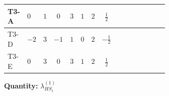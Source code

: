 \documentclass[8pt]{article}
\begin{document}
\begin{landscape}
\begin{longtable}{@{}llcccccc >{\raggedright\arraybackslash}p{0.21\linewidth} >{\raggedright\arraybackslash}p{0.21\linewidth} >{\raggedright\arraybackslash}p{0.21\linewidth}@{}}
\midrule
T3-A & $0$ & $1$ & $0$ & $3$ & $1$ & $2$ & $\frac{1}{2}$ & \scriptsize\adjustbox{max width=\linewidth}{$\begin{gathered} +6 {\lambda_1} {\lambda_{HS_1}^{(1)}}\end{gathered}$} & \scriptsize\adjustbox{max width=\linewidth}{$\begin{gathered} +4 {\lambda_{HS_1}^{(1)}}^2\end{gathered}$} & \scriptsize\adjustbox{max width=\linewidth}{$\begin{gathered} +4 {\lambda_{HS_1}^{(1)}} {\lambda_{S_1}^{(1)}}\end{gathered}$} \\
\midrule
T3-D & $-2$ & $3$ & $-1$ & $1$ & $0$ & $2$ & $-\frac{1}{2}$ & \scriptsize\adjustbox{max width=\linewidth}{$\begin{gathered} +6 {\lambda_1} {\lambda_{HS_1}^{(1)}}\end{gathered}$} & \scriptsize\adjustbox{max width=\linewidth}{$\begin{gathered} +4 {\lambda_{HS_1}^{(1)}}^2\end{gathered}$} & \scriptsize\adjustbox{max width=\linewidth}{$\begin{gathered} +8 {\lambda_{HS_1}^{(1)}} {\lambda_{S_1}^{(1)}}\end{gathered}$} \\
\midrule
T3-E & $0$ & $3$ & $0$ & $3$ & $1$ & $2$ & $\frac{1}{2}$ & \scriptsize\adjustbox{max width=\linewidth}{$\begin{gathered} +6 {\lambda_1} {\lambda_{HS_1}^{(1)}}\end{gathered}$} & \scriptsize\adjustbox{max width=\linewidth}{$\begin{gathered} +4 {\lambda_{HS_1}^{(1)}}^2\end{gathered}$} & \scriptsize\adjustbox{max width=\linewidth}{$\begin{gathered} +8 {\lambda_{HS_1}^{(1)}} {\lambda_{S_1}^{(1)}}\end{gathered}$} \\
\midrule
\bottomrule
\end{longtable}
\clearpage
\noindent\textbf{Quantity: }$\lambda_{HS_1}^{(1)}$\par\smallskip

\end{landscape}
\end{document}
